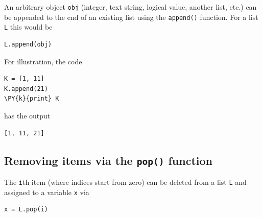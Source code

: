 \noindent
An arbitrary object {\tt obj} (integer, text string, logical value, another list, etc.) can be appended 
to the end of an existing list using the {\tt append()} function. For a list {\tt L} this would be\\

\begin{bbox}
\begin{Verbatim}[commandchars=\\\{\}]
L.append(obj)
\end{Verbatim}
\end{bbox}
\vspace{6mm}

\noindent
For illustration, the code\\

\begin{bbox}
\begin{Verbatim}[commandchars=\\\{\}]
K = [1, 11]
K.append(21)
\PY{k}{print} K
\end{Verbatim}
\end{bbox}
\vspace{6mm}

\noindent
has the output\\

\begin{ybox}
\begin{Verbatim}[commandchars=\\\{\}]
[1, 11, 21]
\end{Verbatim}
\end{ybox}
\vspace{6mm}

\subsection[\ \ Removing items via the {\tt pop()} function]{Removing items via the {\tt pop()} function}

\noindent
The {\tt i}th item (where indices start from zero) can be deleted 
from a list {\tt L} and assigned to a variable {\tt x} via \\

\begin{bbox}
\begin{Verbatim}[commandchars=\\\{\}]
x = L.pop(i)
\end{Verbatim}
\end{bbox}
\vspace{6mm}

